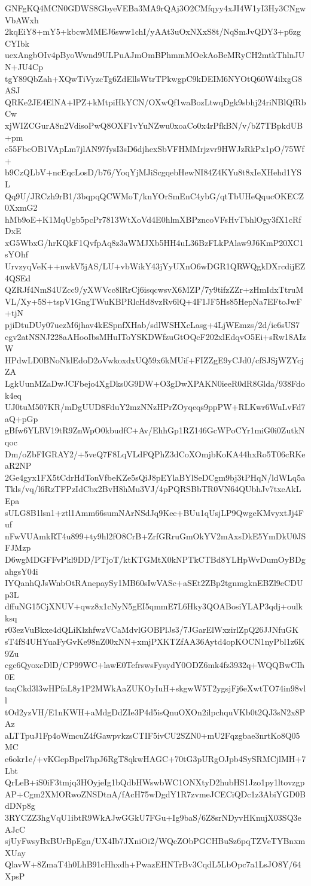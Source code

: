 GNFgKQ4MCN0GDWS8GbyeVEBa3MA9rQAj3O2CMfqyy4xJI4W1yI3Hy3CNgwVbAWxh
2kqEiY8+mY5+kbcwMMEJ6sww1chI/yAAt3uOxNXxS8t/NqSmJvQDY3+p6zgCYIbk
uexAngbOIv4pByoWwnd9ULPuAJmOmBPhmmMOekAoBeMRyCH2mtkThlnJUN+JU4Cp
tgY89QbZah+XQwTiVyzcTg6ZdEllsWtrTPkwgpC9kDEIM6NYOtQ60W4ilxgG8ASJ
QRKe2JE4ElNA+lPZ+kMtpiHkYCN/OXwQf1waBozLtwqDgk9sbhj24riNBlQfRbCw
xjWIZCGurA8n2VdisoPwQ8OXF1vYuNZwu0xoaCo0x4rPfkBN/v/bZ7TBpkdUB+pm
c55FbcOB1VApLm7jlAN97fysI3sD6djhexSbVFHMMrjzvr9HWJzRkPx1pO/75Wf+
b9CzQLbV+ncEqcLosD/b76/YoqYjMJiScgqebHewNI84Z4KYu8t8xIeXHehd1YSL
Qq9U/JRCzh9rB1/3bqpqQCWMoT/knYOrSmEnC4ybG/qtTbUHeQqucOKECZ0XxmG2
hMb9oE+K1MqUgb5pcPr7813WtXoVd4E0hlmXBPzncoVFsHvTbhlOgy3fX1cRfDxE
xG5WbxG/hrKQkF1QvfpAq8z3aWMJXb5HH4uL36BzFLkPAlaw9J6KmP20XC1sYOhf
UrvzyqVeK++nwkV5jAS/LU+vbWikY43jYyUXnO6wDGR1QRWQgkDXrcdijEZ4QSEd
QZRJf4NmS4UZcc9/yXWVcc8lRrCj6isqcwsvX6MZP/7y9tifzZZr+zHmIdxTtruM
VL/Xy+5S+tspV1GngTWuKBPRlcHd8vzRv6lQ+4F1JF5Hs85HepNa7EFtoJwF+tjN
pjiDtuDUy07uezM6jhav4kESpnfXHab/sdlWSHXcLasg+4LjWEmzs/2d/ic6sUS7
cgv2atNSNJ228aAHooIbsMHuIToYSKDWfzuGtOQcF202xlEdqvO5Ei+sRw18AIzW
HPdwLD0BNoNklEdoD2oVwkoxdxUQ59x6kMUif+FIZZgE9yCJd0/cfSJSjWZYcjZA
LgkUunMZaDwJCFbejo4XgDks0G9DW+O3gDwXPAKN0ieeR0dR8Glda/938Fdok4eq
UJ0tuM507KR/mDgUUD8FduY2mzNNzHPrZOyqeqs9ppPW+RLKwr6WuLvFd7aQ+pGp
gBfw6YLRV19tR9ZnWpO0kbudfC+Av/EhhGp1RZ146GcWPoCYr1miG0i0ZutkNqoc
Dm/oZbFIGRAY2/+5veQ7F8LqVLdFQPhZ3dCoXOmjbKoKA44hxRo5T06cRKeaR2NP
2Ge4gyx1FX5tCdrHdTonVfbeKZe5sQiJ8pEYlaBYlSeDCgm9bj3tPHqN/ldWLq5a
Tkls/vq/l6RzTFPzIdCbx2BvH8hMu3VJ/4pPQRSBbTR0VN64QUbhJv7txeAkLEpa
sULG8B1lsn1+ztl1Amm66sumNArNSdJq9Kec+BUu1qUsjLP9QwgeKMvyxtJj4Fuf
nFwVUAmkRT4u899+ty9hl2fO8CrB+ZrfGRruGmOkYV2mAxsDkE5YmDkU0JSFJMzp
D6wgMDGFFvPkl9DD/PTjoT/ktKTGMtX0kNPTkCTBd8YLHpWvDumOyBDgahgsY04i
IYQanhQJsWnbOtRAnepaySy1MB60sIwVASc+aSEt2ZBp2tgnmgknEBZl9eCDUp3L
dffuNG15CjXNUV+qwz8x1cNyN5gEI5qmmE7L6Hky3QOABosiYLAP3qdj+oulkksq
r03ezVuBkxe4dQLiKlzhfwzVCaMdvlGOBPlJs3/7JGarElWxzirlZpQ26JJNfuGK
sT4fS4UHYuaFyGvKe98nZ00xNN+xmjPXKTZfAA36Aytd4opKOCN1nyPbl1z6K9Zu
cgc6QyoxcDlD/CP99WC+lawE0TefrswsFysydY0ODZ6mk4fz3932q+WQQBwCIh0E
taqCkd3l3wHPfaL8y1P2MWkAaZUKOyIuH+skgwW5T2ygsjFj6eXwtTO74in98vll
tOd2yzVH/E1nKWH+aMdgDdZIe3P4d5isQnuOXOn2ilpchquVKb0t2QJ3sN2x8PAz
aLTTpuJ1Fp4oWmcuZ4fGawpvkzsCTIF5ivCU2SZN0+mU2Fqzgbae3nrtKo8Q05MC
e6okr1e/+vKGepBpcl7hpJ6RgT8qkwHAGC+70tG3pURgOJpb4SySRMCjlMH+7Lbt
QrLeB+iS0iF3tmjq3HOyjeIg1bQdbHWswbWC1ONXtyD2hubHS1Jzo1py1ltovzgp
AP+Cgm2XMORwoZNSDtnA/fAcH75wDgdY1R7zvmeJCECiQDc1z3AbiYGD0BdDNp8g
3RYCZZ3hgVqU1ibtR9WkAJwGGkU7FGu+Ig9baS/6Z8srNDyvHKnujX03SQ3eAJcC
sjUyFwsyBxBUrBpEgn/UX4Ib7JXniOi2/WQcZObPGCHBuSz6pqTZVeTYBnxmXUay
QlavW+8ZmaT4h0LhB91cHhxdh+PwazEHNTrBv3CqdL5LbOpc7a1LsJO8Y/64XpsP
